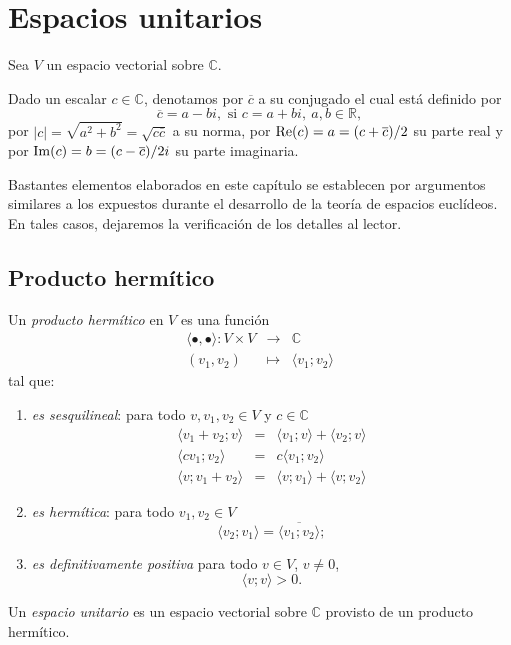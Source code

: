 \chapter{Espacios unitarios}

Sea $V$ un espacio vectorial sobre $\mathbb{C}$.

\begin{nota}
Dado un escalar $c\in\mathbb{C}$, denotamos por $\overline{c}$ a su conjugado el cual est\'a definido por
\[
\overline{c}=a-bi,\textrm{ si } c=a+bi,\ a,b\in\mathbb{R},
\]
por $|c|=\sqrt{a^2+b^2}=\sqrt{c\overline{c}}$ a su norma, por $\operatorname{Re}(c)=a=(c+\overline{c})/2$ su parte real y por $\operatorname{Im}(c)=b=(c-\overline{c})/2i$ su parte imaginaria.
\end{nota}

\begin{obs}
Bastantes elementos elaborados en este cap\'itulo se establecen por argumentos similares a los expuestos durante el desarrollo de la teor\'ia de espacios eucl\'ideos. En tales casos, dejaremos la verificaci\'on de los detalles al lector. 
\end{obs}

\section{Producto herm\'itico}

\begin{defn}
Un \emph{producto herm\'itico} en $V$ es una funci\'on
\begin{eqnarray*}
\langle\bullet,\bullet\rangle: V\times V & \longrightarrow & \mathbb{C}\\
(v_1,v_2) & \longmapsto & \langle v_1;v_2\rangle
\end{eqnarray*}
tal que:
\begin{enumerate}
\item \emph{es sesquilineal}: para todo $v,v_1,v_2\in V$ y $c\in\mathbb{C}$
\begin{eqnarray*}
\langle v_1+v_2;v\rangle & = & \langle v_1;v\rangle+\langle v_2;v\rangle\\
\langle cv_1;v_2\rangle & = & c\langle v_1;v_2\rangle\\
\langle v;v_1+v_2\rangle & = & \langle v;v_1\rangle + \langle v;v_2\rangle
\end{eqnarray*}
\item \emph{es herm\'itica}: para todo $v_1,v_2\in V$
\[
\langle v_2;v_1\rangle=\overline{\langle v_1;v_2\rangle};
\]
\item \emph{es definitivamente positiva} para todo $v\in V$, $v\ne 0$,
\[
\langle v;v\rangle>0.
\]
\end{enumerate}
Un \emph{espacio unitario} es un espacio vectorial sobre $\mathbb{C}$ provisto de un producto herm\'itico. 
\end{defn}


